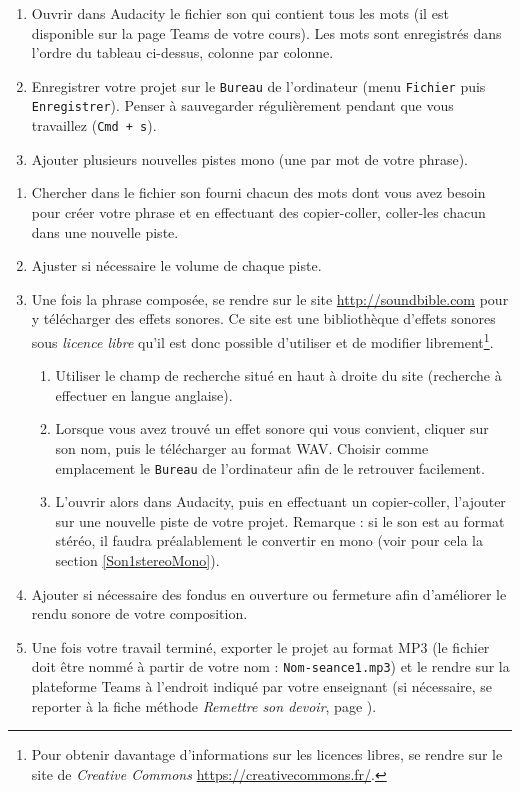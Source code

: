 {\begin{enumerate}
\item Ouvrir dans Audacity le fichier son qui contient tous les mots (il est disponible sur la page Teams de votre cours). Les mots sont enregistrés dans l'ordre du tableau ci-dessus, colonne par colonne.
\item Enregistrer votre projet sur le \texttt{Bureau} de l'ordinateur (menu \texttt{Fichier} puis \texttt{Enregistrer}). Penser à sauvegarder régulièrement pendant que vous travaillez (\texttt{Cmd + s}).   
\item Ajouter plusieurs nouvelles pistes mono (une par mot de votre phrase). 
\setcounter{tmp}{\value{enumi}}  
\end{enumerate}
\begin{enumerate}
\setcounter{enumi}{\value{tmp}}
\item Chercher dans le fichier son fourni chacun des mots dont vous avez besoin pour créer votre phrase et en effectuant des copier-coller, coller-les chacun dans une nouvelle piste.
\item Ajuster si nécessaire le volume de chaque piste.
\item Une fois la phrase composée, se rendre sur le site \url{http://soundbible.com} pour y télécharger des effets sonores. Ce site est une bibliothèque d'effets sonores sous \emph{licence libre} qu'il est donc possible d'utiliser et de modifier librement\footnote{Pour obtenir davantage d'informations sur les licences libres, se rendre sur le site de \emph{Creative Commons} \url{https://creativecommons.fr/}.}.
        \begin{enumerate}
        \item Utiliser le champ de recherche situé en haut à droite du site (recherche à effectuer en langue anglaise).
        \item Lorsque vous avez trouvé un effet sonore qui vous convient, cliquer sur son nom, puis le télécharger au format WAV. Choisir comme emplacement le \texttt{Bureau} de l'ordinateur afin de le retrouver facilement.
        \item L'ouvrir alors dans Audacity, puis en effectuant un copier-coller, l'ajouter sur une nouvelle piste de votre projet. Remarque : si le son est au format stéréo, il faudra préalablement le convertir en mono (voir pour cela la section \vref{Son1stereoMono}). 
        \end{enumerate}
\item Ajouter si nécessaire des fondus en ouverture ou fermeture afin d'améliorer le rendu sonore de votre composition.
\item Une fois votre travail terminé, exporter le projet au format MP3 (le fichier doit être nommé à partir de votre nom : \texttt{Nom-seance1.mp3}) et le rendre sur la plateforme Teams à l'endroit indiqué par votre enseignant (si nécessaire, se reporter à la fiche méthode \emph{Remettre son devoir}, page \pageref{TeamsRemettreDevoir}). 
\end{enumerate}

}%

